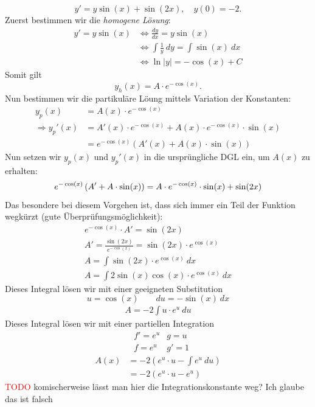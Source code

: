 \documentclass[a4paper,landscape,8pt]{extarticle}
\newcommand{\abs}[1]{\left\lvert #1 \right\rvert}
\newcommand{\todo}{\textcolor{red}{TODO }}
\begin{document}
\begin{multicols*}{4}
\begin{warmup}
\Bsp
\[
y' = y \sin(x) + \sin(2x), \quad y(0) = -2.
\]
Zuerst bestimmen wir die \emph{homogene Lösung}:
\begin{align*}
y' = y \sin(x) &\Longleftrightarrow \frac{dy}{dx} = y \sin(x)\\
&\Longleftrightarrow \int \frac{1}{y} \ dy = \int \sin(x) \ dx\\
&\Longleftrightarrow \ln \abs{y} = -\cos(x) + C
\end{align*}
Somit gilt
\[
y_h(x) = A \cdot e^{-\cos(x)}.
\]
Nun bestimmen wir die partikuläre Löung mittels Variation der Konstanten:
\begin{align*}
y_p(x) &= A(x) \cdot e^{-\cos(x)} \\
\Longrightarrow y_p'(x) &= A'(x) \cdot e^{-\cos(x)} + A(x) \cdot
e^{-\cos(x)}\cdot \sin(x)\\
&= e^{-\cos(x)} \left(A'(x) + A(x)\cdot \sin(x)\right)
\end{align*}
Nun setzen wir $y_p(x)$ und $y_p'(x)$ in die ursprüngliche DGL ein, um $A(x)$ zu
erhalten:
\[
e^{-\cos(x)} \left(A' + A\cdot \sin(x)\right) = A \cdot
e^{-\cos(x)}\cdot\sin(x) + \sin(2x)\\
\]
Das besondere bei diesem Vorgehen ist, dass sich immer ein Teil der Funktion
wegkürzt (gute Überprüfungsmöglichkeit):
\begin{align*}
e^{-\cos(x)}\cdot A' = \sin(2x)\\
A' = \frac{\sin(2x)}{e^{-\cos(x)}} = \sin(2x)\cdot e^{\cos(x)}\\
A = \int \sin(2x)\cdot e^{\cos(x)} \ dx\\
A = \int 2\sin(x)\cos(x)\cdot e^{\cos(x)} \ dx
\end{align*}
Dieses Integral lösen wir mit einer geeigneten Substitution
\[
u = \cos(x) \qquad du = -\sin(x) \ dx	
\]
\begin{align*}
A = -2\int u\cdot e^u \ du 
\end{align*}
Dieses Integral lösen wir mit einer partiellen Integration
\begin{align*}
& f' = e^{u} & g = u\\
& f = e^{u} & g' = 1
\end{align*}
\begin{align*}
A(x) &= -2\left(e^{u}\cdot u - \int e^{u} \ du\right)\\
&= -2 \left(e^{u}\cdot u - e^{u}\right)
\end{align*}
\todo komischerweise lässt man hier die Integrationskonstante weg? Ich glaube
das ist falsch


\end{warmup}
\end{multicols*}
\end{document}
